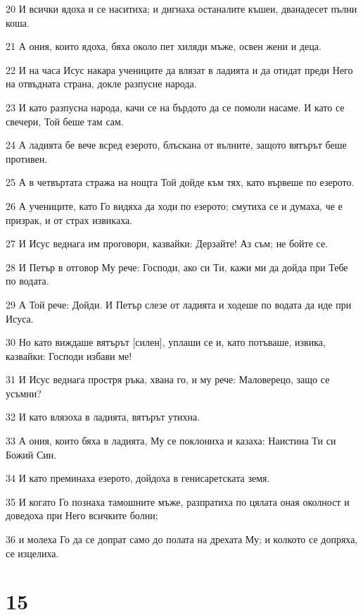 \par 20 И всички ядоха и се наситиха; и дигнаха останалите къшеи, дванадесет пълни коша.
\par 21 А ония, които ядоха, бяха около пет хиляди мъже, освен жени и деца.
\par 22 И на часа Исус накара учениците да влязат в ладията и да отидат преди Него на отвъдната страна, докле разпусне народа.
\par 23 И като разпусна народа, качи се на бърдото да се помоли насаме. И като се свечери, Той беше там сам.
\par 24 А ладията бе вече всред езерото, блъскана от вълните, защото вятърът беше противен.
\par 25 А в четвъртата стража на нощта Той дойде към тях, като вървеше по езерото.
\par 26 А учениците, като Го видяха да ходи по езерото; смутиха се и думаха, че е призрак, и от страх извикаха.
\par 27 И Исус веднага им проговори, казвайки: Дерзайте! Аз съм; не бойте се.
\par 28 И Петър в отговор Му рече: Господи, ако си Ти, кажи ми да дойда при Тебе по водата.
\par 29 А Той рече: Дойди. И Петър слезе от ладията и ходеше по водата да иде при Исуса.
\par 30 Но като виждаше вятърът [силен], уплаши се и, като потъваше, извика, казвайки: Господи избави ме!
\par 31 И Исус веднага простря ръка, хвана го, и му рече: Маловерецо, защо се усъмни?
\par 32 И като влязоха в ладията, вятърът утихна.
\par 33 А ония, които бяха в ладията, Му се поклониха и казаха: Наистина Ти си Божий Син.
\par 34 И като преминаха езерото, дойдоха в генисаретската земя.
\par 35 И когато Го познаха тамошните мъже, разпратиха по цялата оная околност и доведоха при Него всичките болни;
\par 36 и молеха Го да се допрат само до полата на дрехата Му; и колкото се допряха, се изцелиха.

\chapter{15}

